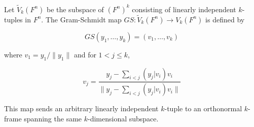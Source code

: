 Let $\tilde{V}_k(F^n)$ be the subspace of $(F^n)^k$ consisting of linearly independent $k$-tuples in $F^n$. The Gram-Schmidt map $GS: \tilde{V}_k(F^n) \to V_k(F^n)$ is defined by

$$GS(y_1, \ldots, y_k) = (v_1, \ldots, v_k)$$

where $v_1 = y_1 / \|y_1\|$ and for $1 < j \leq k$,

$$v_j = \frac{y_j - \sum_{i < j} (y_j | v_i) v_i}{\| y_j - \sum_{i < j} (y_j | v_i) v_i \|}$$

This map sends an arbitrary linearly independent $k$-tuple to an orthonormal $k$-frame spanning the same $k$-dimensional subspace.
